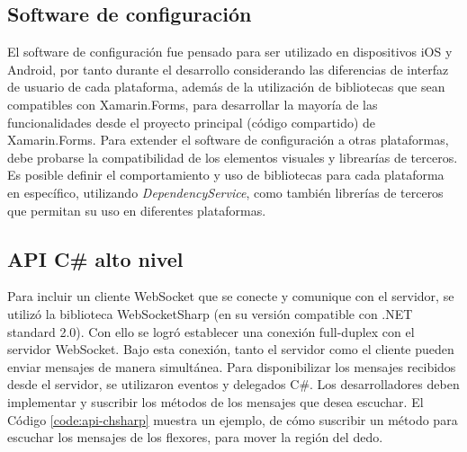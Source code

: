\subsection{Software de configuración}
El software de configuración fue pensado para ser utilizado en dispositivos iOS y Android, por tanto durante el desarrollo considerando las diferencias de interfaz de usuario de cada plataforma, además de la utilización de bibliotecas que sean compatibles con Xamarin.Forms, para desarrollar la mayoría de las funcionalidades desde el proyecto principal (código compartido) de Xamarin.Forms. Para extender el software de configuración a otras plataformas, debe probarse la compatibilidad de los elementos visuales y librearías de terceros. Es posible definir el comportamiento y uso de bibliotecas para cada plataforma en específico, utilizando \textit{DependencyService}, como también librerías de terceros que permitan su uso en diferentes plataformas.



	
\newpage
\subsection{API C\# alto nivel}
	Para incluir un cliente WebSocket que se conecte y comunique con el servidor, se utilizó la biblioteca WebSocketSharp (en su versión compatible con .NET standard 2.0). Con ello se logró establecer una conexión full-duplex con el servidor WebSocket. Bajo esta conexión, tanto el servidor como el cliente pueden enviar mensajes de manera simultánea. Para disponibilizar los mensajes recibidos desde el servidor, se utilizaron eventos y delegados C\#. Los desarrolladores deben implementar y suscribir los métodos de los mensajes que desea escuchar. El Código \ref{code:api-chsharp} muestra un ejemplo, de cómo suscribir un método para escuchar los mensajes de los flexores, para mover la región del dedo.
	
